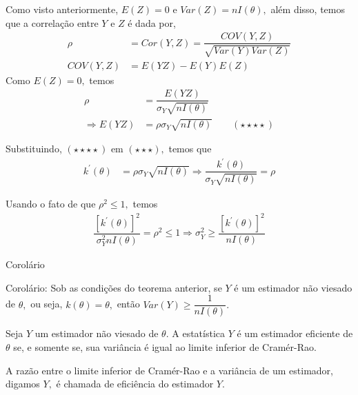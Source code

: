 \documentclass[12pt]{beamer}
\begin{document}
\begin{frame}{}
\vspace{-0.2cm}
\begin{block}{}
\justifying
Como visto anteriormente, $E(Z)=0$ e $Var(Z)=nI(\theta),$ além disso, temos que a correlação entre $Y$ e $Z$ é dada por,
\begin{align*}
    \rho&=Cor(Y,Z)=\dfrac{COV(Y,Z)}{\sqrt{Var(Y)Var(Z)}}\\
    COV(Y,Z)&=E(YZ)-E(Y)E(Z)
\end{align*}
Como $E(Z)=0,$ temos
\begin{align*}
    \rho&=\dfrac{E(YZ)}{\sigma_{Y}\sqrt{nI(\theta)}}\\
    \Rightarrow E(YZ)&=\rho \sigma_{Y}\sqrt{nI(\theta)}\qquad (\star\star\star\star)
\end{align*}
\end{block}
\pause
\begin{block}{}
\justifying
Substituindo, $(\star\star\star\star)$ em $(\star\star\star),$ temos que 
\begin{align*}
k^{'}(\theta)&=\rho \sigma_{Y}\sqrt{nI(\theta)}\Rightarrow \dfrac{k^{'}(\theta)}{\sigma_{Y}\sqrt{nI(\theta)}} =\rho  
\end{align*}
\end{block}
\end{frame}

\begin{frame}{}
\begin{block}{}
\justifying
Usando o fato de que $\rho^{2}\leq 1,$ temos
\begin{align*}
\dfrac{[k^{'}(\theta)]^{2}}{\sigma_{Y}^{2}nI(\theta)} =\rho^{2}\leq 1\Rightarrow  \sigma_{Y}^{2}\geq  \dfrac{[k^{'}(\theta)]^{2}}{nI(\theta)}
\end{align*}
\end{block}
\end{frame}

\begin{frame}{Corolário}
\begin{block}{Corolário:}
\justifying
Sob as condições do teorema anterior, se $Y$ é um estimador não viesado de $\theta,$ ou seja, $k(\theta)=\theta,$ então $Var(Y)\geq \dfrac{1}{nI(\theta)}.$
\end{block}
\pause
\begin{definicao}
\justifying
    Seja $Y$ um estimador não viesado de $\theta.$ A estatística $Y$ é um estimador eficiente de $\theta$ se, e somente se, sua variância é igual ao limite inferior de Cramér-Rao.
\end{definicao}
\pause
\begin{definicao}
\justifying
    A razão entre o limite inferior de Cramér-Rao e a variância de um estimador, digamos $Y,$ é chamada de eficiência do estimador $Y.$
\end{definicao}
\end{frame}
\end{document}
